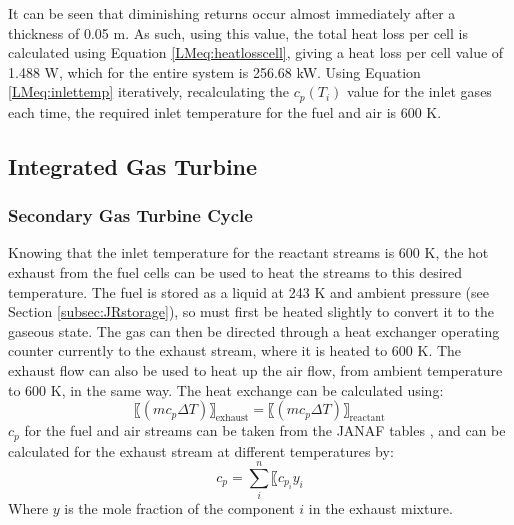It can be seen that diminishing returns occur almost immediately after a thickness of 0.05 m. As such, using this value, the total heat loss per cell is calculated using Equation \ref{LMeq:heatlosscell}, giving a heat loss per cell value of 1.488 W, which for the entire system is 256.68 kW. Using Equation \ref{LMeq:inlettemp} iteratively, recalculating the $c_{p}(T_i )$  value for the inlet gases each time, the required inlet temperature for the fuel and air is 600 K.\\

\subsection{Integrated Gas Turbine}
\label{LMintegratedgascycle}
\subsubsection{Secondary Gas Turbine Cycle}
        
Knowing that the inlet temperature for the reactant streams is 600 K, the hot exhaust from the fuel cells can be used to heat the streams to this desired temperature. The fuel is stored as a liquid at 243 K and ambient pressure (see Section \ref{subsec:JRstorage}), so must first be heated slightly to convert it to the gaseous state. The gas can then be directed through a heat exchanger operating counter currently to the exhaust stream, where it is heated to 600 K. The exhaust flow can also be used to heat up the air flow, from ambient temperature to 600 K, in the same way. The heat exchange can be calculated using:
\begin{equation}
 〖(mc_p \Delta T)〗_{\text{exhaust}}= 〖(mc_p \Delta T)〗_{\text{reactant}}	
 \label{LMeq:heatexchanger}
 \end{equation}
$c_p$ for the fuel and air streams can be taken from the JANAF tables \cite{JANAF}, and can be calculated for the exhaust stream at different temperatures by:
\begin{equation}
 c_p= \sum\limits_{i}^n〖c_{p_{i}}  y_i						
  \end{equation}
Where $y$ is the mole fraction of the component $i$ in the exhaust mixture. 


